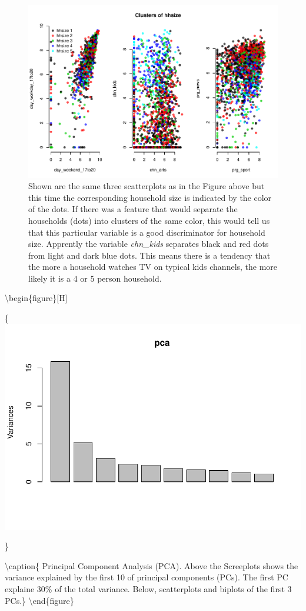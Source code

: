 \documentclass[]{article}
\begin{document}
\begin{figure}
\centering
\includegraphics{Diploma_files/figure-latex/fig4-1.pdf}
\caption{\label{fig:fig4} Shown are the same three scatterplots as in
the Figure above but this time the corresponding household size is
indicated by the color of the dots. If there was a feature that would
separate the households (dots) into clusters of the same color, this
would tell us that this particular variable is a good discriminator for
household size. Apprently the variable \emph{chn\_kids} separates black
and red dots from light and dark blue dots. This means there is a
tendency that the more a household watches TV on typical kids channels,
the more likely it is a 4 or 5 person household.}
\end{figure}

\textbackslash{}begin\{figure\}{[}H{]}

\{\centering \includegraphics[width=0.5\linewidth]{Diploma_files/figure-latex/fig5-1}

\}

\textbackslash{}caption\{\label{fig:fig4} Principal Component Analysis
(PCA). Above the Screeplots shows the variance explained by the first 10
of principal components (PCs). The first PC explaine 30\% of the total
variance. Below, scatterplots and biplots of the first 3
PCs.\}\label{fig:fig5} \textbackslash{}end\{figure\}
\end{document}
